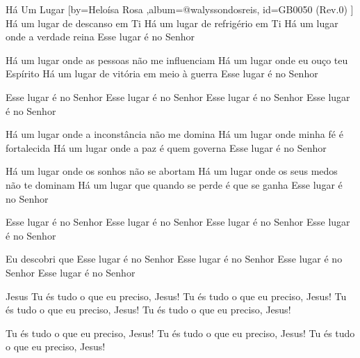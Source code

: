 \beginsong
{Há Um Lugar %
}[by={Heloísa Rosa %
},album={@walyssondosreis},
id={GB0050 %
(Rev.0) %
}]
Há um lugar de descanso em Ti
Há um lugar de refrigério em Ti
Há um lugar onde a verdade reina
Esse lugar é no Senhor

Há um lugar onde as pessoas não me influenciam
Há um lugar onde eu ouço teu Espírito
Há um lugar de vitória em meio à guerra
Esse lugar é no Senhor

Esse lugar é no Senhor
Esse lugar é no Senhor
Esse lugar é no Senhor
Esse lugar é no Senhor

Há um lugar onde a inconstância não me domina
Há um lugar onde minha fé é fortalecida
Há um lugar onde a paz é quem governa
Esse lugar é no Senhor

Há um lugar onde os sonhos não se abortam
Há um lugar onde os seus medos não te dominam
Há um lugar que quando se perde é que se ganha
Esse lugar é no Senhor

Esse lugar é no Senhor
Esse lugar é no Senhor
Esse lugar é no Senhor
Esse lugar é no Senhor

Eu descobri que
Esse lugar é no Senhor
Esse lugar é no Senhor
Esse lugar é no Senhor
Esse lugar é no Senhor

Jesus
Tu és tudo o que eu preciso, Jesus!
Tu és tudo o que eu preciso, Jesus!
Tu és tudo o que eu preciso, Jesus!
Tu és tudo o que eu preciso, Jesus!

Tu és tudo o que eu preciso, Jesus!
Tu és tudo o que eu preciso, Jesus!
Tu és tudo o que eu preciso, Jesus!


